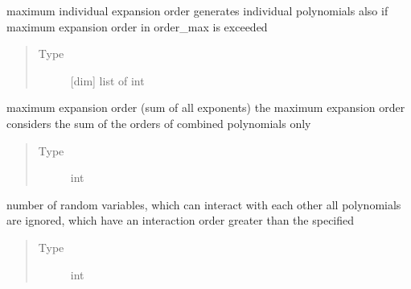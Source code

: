 \documentclass[letterpaper,10pt,english,openany,oneside]{sphinxmanual}
\begin{document}
\begin{fulllineitems}
\begin{fulllineitems}
\label{\detokenize{pygpc:pygpc.quad.Quad.order}}
maximum individual expansion order
generates individual polynomials also if maximum expansion order in order\_max is exceeded
\begin{quote}\begin{description}
\item[{Type}] \leavevmode
{[}dim{]} list of int

\end{description}\end{quote}

\end{fulllineitems}


\begin{fulllineitems}
\label{\detokenize{pygpc:pygpc.quad.Quad.order_max}}
maximum expansion order (sum of all exponents)
the maximum expansion order considers the sum of the orders of combined polynomials only
\begin{quote}\begin{description}
\item[{Type}] \leavevmode
int

\end{description}\end{quote}

\end{fulllineitems}


\begin{fulllineitems}
\label{\detokenize{pygpc:pygpc.quad.Quad.interaction_order}}
number of random variables, which can interact with each other
all polynomials are ignored, which have an interaction order greater than the specified
\begin{quote}\begin{description}
\item[{Type}] \leavevmode
int

\end{description}\end{quote}

\end{fulllineitems}



\end{fulllineitems}
\end{document}
